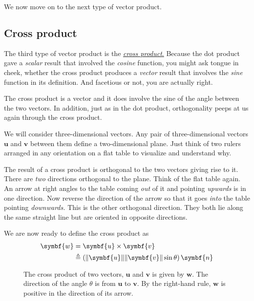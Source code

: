 \documentclass[
  a4paper,
]{article}
\begin{document}
We now move on to the next type of vector product.

\hypertarget{cross-product}{%
\subsection{Cross product}\label{cross-product}}

The third type of vector product is the
\href{https://mathworld.wolfram.com/CrossProduct.html}{\emph{cross
product}.} Because the dot product gave a \emph{scalar} result that
involved the \emph{cosine} function, you might ask tongue in cheek,
whether the cross product produces a \emph{vector} result that involves
the \emph{sine} function in its definition. And facetious or not, you
are actually right.  \normalfont

The cross product is a vector and it does involve the sine of the angle
between the two vectors. In addition, just as in the dot product,
orthogonality peeps at us again through the cross product.

We will consider three-dimensional vectors. Any pair of
three-dimensional vectors \(\symbf{u}\) and \(\symbf{v}\) between them
define a two-dimensional plane. Just think of two rulers arranged in any
orientation on a flat table to visualize and understand why.

The result of a cross product is orthogonal to the two vectors giving
rise to it. There are \emph{two} directions orthogonal to the plane.
Think of the flat table again. An arrow at right angles to the table
coming \emph{out} of it and pointing \emph{upwards} is in one direction.
Now reverse the direction of the arrow so that it goes \emph{into} the
table pointing \emph{downwards.} This is the other orthogonal direction.
They both lie along the same straight line but are oriented in opposite
directions.

We are now ready to define the cross product as \[
\begin{aligned}
\symbf{w} &= \symbf{u} \times \symbf{v}\\
&\triangleq (\lVert\symbf{u}\rVert \lVert\symbf{v}\rVert \sin \theta) \thinspace \symbf{n}
\end{aligned}
\]

\begin{figure}
\hypertarget{fig:cross-product}{%
\centering

\caption{The cross product of two vectors, \(\symbf{u}\) and
\(\symbf{v}\) is given by \(\symbf{w}\). The direction of the angle
\(\theta\) is from \(\symbf{u}\) to \(\symbf{v}\). By the right-hand
rule, \(\symbf{w}\) is positive in the direction of its
arrow.}\label{fig:cross-product}
}
\end{figure}
\end{document}
